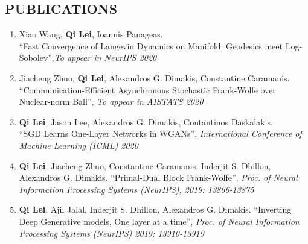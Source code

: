 \documentclass[margin, 10pt]{res} %
\begin{document}
\begin{resume}

\section{PUBLICATIONS}
\begin{enumerate}
\item{ Xiao Wang, \textbf{Qi Lei}, Ioannis Panageas. \\ ``Fast Convergence of Langevin Dynamics on Manifold: Geodesics meet Log-Sobolev'',\textit{To appear in NeurIPS 2020}  }
  \item{Jiacheng Zhuo, \textbf{Qi Lei}, Alexandros G. Dimakis, Constantine 
      Caramanis.\\ ``Communication-Efficient Asynchronous Stochastic 
    Frank-Wolfe over Nuclear-norm Ball'', \textit{To appear in AISTATS 2020} }
\item{\textbf{Qi Lei}, Jason Lee, Alexandros G. Dimakis, Contantinos 
  Daskalakis. \\ ``SGD Learns One-Layer Networks in WGANs'', 
    \textit{International Conference of Machine Learning (ICML) 2020}}
  \item{ \textbf{Qi Lei}, Jiacheng Zhuo, Constantine Caramanis, Inderjit S. 
    Dhillon, Alexandros G. Dimakis. ``Primal-Dual Block Frank-Wolfe'', 
  \textit{Proc. of Neural Information Processing Systems (NeurIPS), 2019: 13866-13875} }
  \item{ \textbf{Qi Lei}, Ajil Jalal, Inderjit S. Dhillon, Alexandros G. 
      Dimakis. ``Inverting Deep Generative models, One layer at a time'', 
    \textit{Proc. of Neural Information Processing Systems (NeurIPS) 2019: 13910-13919} }


\end{enumerate}
\end{resume}
\end{document}
